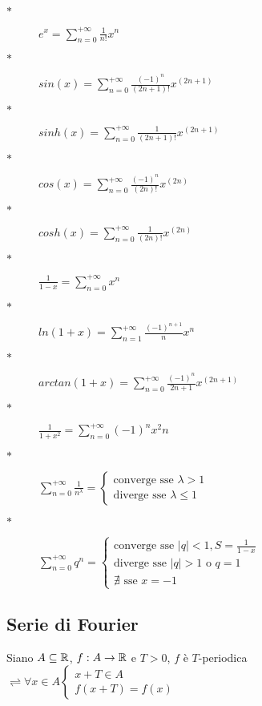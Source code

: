 \begin{description}
	\item[$\ast$] $e^x=\sum\limits_{n=0}^{+\infty}\frac{1}{n!}x^n$
	\item[$\ast$] $sin(x)=\sum\limits_{n=0}^{+\infty}\frac{(-1)^n}{(2n+1)!}x^{(2n+1)}$
	\item[$\ast$] $sinh(x)=\sum\limits_{n=0}^{+\infty}\frac{1}{(2n+1)!}x^{(2n+1)}$
	\item[$\ast$] $cos(x)=\sum\limits_{n=0}^{+\infty}\frac{(-1)^n}{(2n)!}x^{(2n)}$
	\item[$\ast$] $cosh(x)=\sum\limits_{n=0}^{+\infty}\frac{1}{(2n)!}x^{(2n)}$
	\item[$\ast$] $\frac{1}{1-x}=\sum\limits_{n=0}^{+\infty}x^n$
	\item[$\ast$] $ln(1+x)=\sum\limits_{n=1}^{+\infty}\frac{(-1)^{n+1}}{n}x^n$
	\item[$\ast$] $arctan(1+x)=\sum\limits_{n=0}^{+\infty}\frac{(-1)^{n}}{2n+1}x^{(2n+1)}$
	\item[$\ast$] $\frac{1}{1+x^2}=\sum\limits_{n=0}^{+\infty}(-1)^nx^2n$
	\item[$\ast$] $\sum\limits_{n=0}^{+\infty}\frac{1}{n^\lambda}=\left\{\begin{matrix}\text{converge sse } \lambda >1\\ \text{diverge sse } \lambda \le 1 \end{matrix}\right.$
	\item[$\ast$] $\sum\limits_{n=0}^{+\infty}q^n=\left\{\begin{matrix}\text{converge sse } |q|<1, S=\frac{1}{1-x}\\ \text{diverge sse } |q|>1\text{ o }q=1\\\nexists \text{ sse } x=-1 \end{matrix}\right.$
\end{description}


\subsection{Serie di Fourier}
Siano $A\subseteq \mathbb{R}$, $f:A\to \mathbb{R}$ e $T>0$, $f$ è $T$-periodica $\rightleftharpoons \forall x\in A
\left\{\begin{matrix}
x+T\in A\\f(x+T)=f(x)
\end{matrix}\right. $\\


